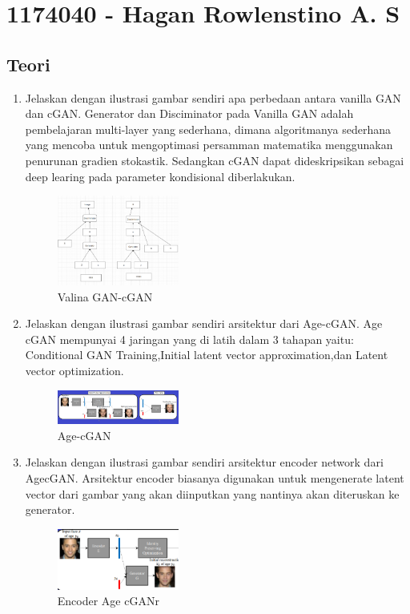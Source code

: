 \section{1174040 - Hagan Rowlenstino A. S}

\subsection{Teori}
\begin{enumerate}

        \item Jelaskan dengan ilustrasi gambar sendiri apa perbedaan antara vanilla GAN dan cGAN.
		Generator dan Disciminator pada Vanilla GAN adalah pembelajaran multi-layer yang sederhana, dimana algoritmanya sederhana yang mencoba untuk mengoptimasi persamman matematika menggunakan penurunan gradien stokastik. Sedangkan cGAN dapat dideskripsikan sebagai deep learing pada parameter kondisional diberlakukan.
			\begin{figure}[H]
            	\includegraphics[width=4cm]{figures/1174040/chapter9/teori1.PNG}
           		\centering
           		\caption{Valina GAN-cGAN}
            \end{figure}
            
        \item Jelaskan dengan ilustrasi gambar sendiri arsitektur dari Age-cGAN.
		Age cGAN mempunyai 4 jaringan yang  di latih dalam 3 tahapan yaitu: Conditional GAN Training,Initial latent vector approximation,dan Latent vector optimization.
			\begin{figure}[H]
				\includegraphics[width=4cm]{figures/1174040/chapter9/teori2.PNG}
            		\centering
           		\caption{Age-cGAN}
            \end{figure}
                
        \item Jelaskan dengan ilustrasi gambar sendiri arsitektur encoder network dari AgecGAN.
		Arsitektur encoder biasanya digunakan untuk mengenerate latent vector dari gambar yang akan diinputkan yang nantinya akan diteruskan ke generator.
            \begin{figure}[H]
                \includegraphics[width=4cm]{figures/1174040/chapter9/teori3.PNG}
                    \centering
                \caption{Encoder Age cGANr}
            \end{figure}


\end{enumerate}
